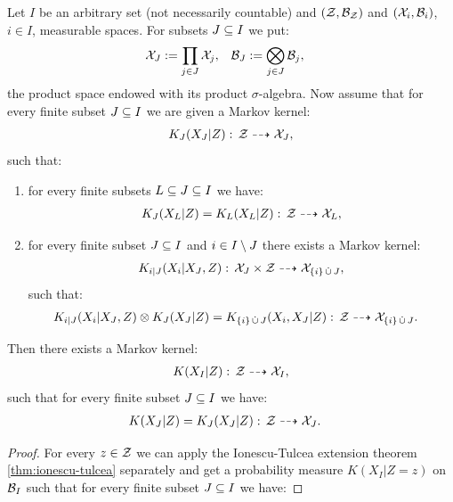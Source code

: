 \begin{Cor}
    \label{cor:ionescu-tulcea-markov-kernels}
    Let $I$ be an arbitrary set (not necessarily countable) and $(\mathcal{Z},\mathcal{B}_{\mathcal{Z}})$ and $(\mathcal{X}_i,\mathcal{B}_i)$, $i \in I$, measurable spaces.
    For subsets $J \subseteq I$ we put:
    \begin{align}
        \mathcal{X}_J &:= \prod_{j \in J} \mathcal{X}_j, & \mathcal{B}_J&:= \bigotimes_{j \in J} \mathcal{B}_j,
    \end{align}
    the product space endowed with its product $\sigma$-algebra.
    Now assume that for every finite subset $J \subseteq I$  we are given a Markov kernel:
    \begin{align*}
        K_J(X_J|Z):\, \mathcal{Z} \dashrightarrow \mathcal{X}_J,
    \end{align*}
     such that:
    \begin{enumerate}
        \item for every finite subsets $L \subseteq J \subseteq I$ we have:
          \begin{align*}
              K_J(X_L|Z) = K_L(X_L|Z):\, \mathcal{Z} \dashrightarrow \mathcal{X}_L,
          \end{align*}
        \item for every finite subset $J \subseteq I$ and $i \in I \setminus J$ there exists a Markov kernel:
          \begin{align*}
              K_{i|J}(X_i|X_J,Z):\, \mathcal{X}_J\times\mathcal{Z} \dashrightarrow \mathcal{X}_{\{i\} \,\dot{\cup}\, J},
          \end{align*}
           such that:
          \begin{align*}
              K_{i|J}(X_i|X_J,Z) \otimes K_J(X_J|Z) & = K_{\{i\} \,\dot{\cup}\, J}(X_i,X_J|Z)  :\, \mathcal{Z} \dashrightarrow \mathcal{X}_{\{i\} \,\dot{\cup}\, J}.
          \end{align*}
    \end{enumerate}
    Then there exists a Markov kernel:
    \begin{align*}
        K(X_I|Z):\, \mathcal{Z} \dashrightarrow \mathcal{X}_I,
    \end{align*}
    such that for every finite subset $J \subseteq I$ we have:
    \begin{align*}
        K(X_J|Z) &= K_J(X_J|Z):\, \mathcal{Z} \dashrightarrow \mathcal{X}_J.
    \end{align*}
\begin{proof}
    For every $z \in \mathcal{Z}$ we can apply the Ionescu-Tulcea extension theorem \ref{thm:ionescu-tulcea} separately and get a probability measure 
    $K(X_I|Z=z)$ on $\mathcal{B}_I$ such that for every finite subset $J \subseteq I$ we have:

\end{proof}
\end{Cor}
